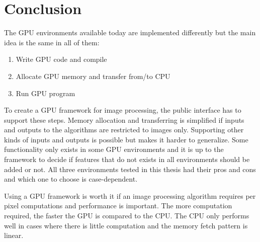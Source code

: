 \section{Conclusion}

The GPU environments available today are implemented differently but the main idea is the same in all of them:
\begin{enumerate}
\item Write GPU code and compile
\item Allocate GPU memory and transfer from/to CPU
\item Run GPU program
\end{enumerate}
To create a GPU framework for image processing, the public interface has to support these steps. Memory allocation and transferring is simplified if inputs and outputs to the algorithms are restricted to images only. Supporting other kinds of inputs and outputs is possible but makes it harder to generalize. Some functionality only exists in some GPU environments and it is up to the framework to decide if features that do not exists in all environments should be added or not. All three environments tested in this thesis had their pros and cons and which one to choose is case-dependent.
\newline

Using a GPU framework is worth it if an image processing algorithm requires per pixel computations and performance is important. The more computation required, the faster the GPU is compared to the CPU. The CPU only performs well in cases where there is little computation and the memory fetch pattern is linear.

